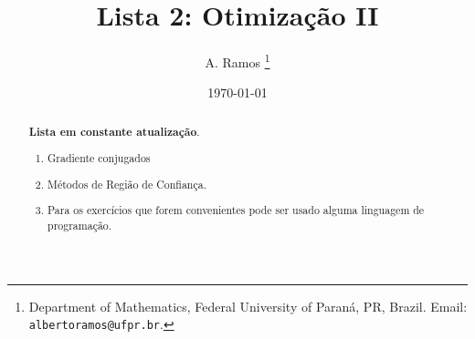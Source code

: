 \documentclass[a4paper,latin]{article}
\begin{document}
\title{Lista 2: Otimização II }
 
\author{
A. Ramos \thanks{Department of Mathematics,
    Federal University of Paraná, PR, Brazil.
    Email: {\tt albertoramos@ufpr.br}.}
}

\date{\today}
 
\maketitle

\begin{abstract}
{\bf Lista em constante atualização}.
 \begin{enumerate}
 \item Gradiente conjugados
 \item Métodos de Região de Confiança.
 \item Para os exercícios que forem convenientes pode ser usado alguma linguagem  de programação.  
 \end{enumerate}
\end{abstract}

       
\end{document}
